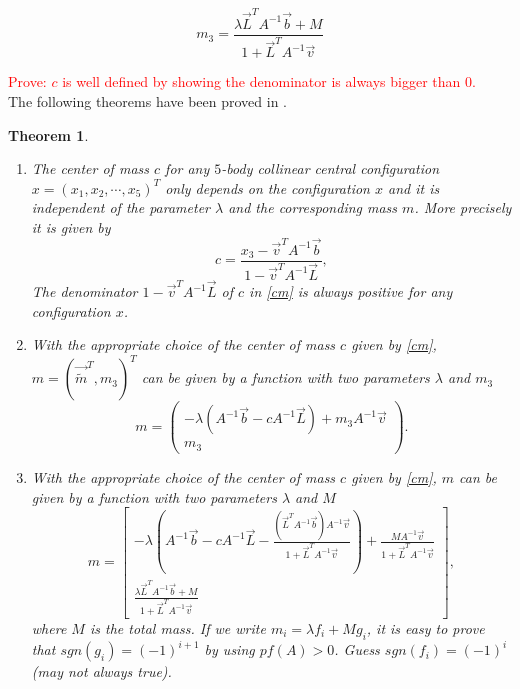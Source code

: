\documentclass[11pt,leqno]{article}
\newtheorem{theorem}{Theorem}[section]
\theoremstyle{definition}
\theoremstyle{remark}
\numberwithin{equation}{section}
\begin{document}
$$m_3=\frac{\lambda \vec{L}^TA^{-1}\vec{b}+M}{1+\vec{L}^TA^{-1}\vec{v}}$$


\textcolor{red}{Prove: $c$ is well defined by showing the denominator is always bigger than 0.}\\
The following theorems have been proved in \cite{ZX6}. 
\begin{theorem}\label{thm5}
\begin{enumerate}
 \item The center of mass $c$ for any $5$-body collinear central configuration $x=(x_1,x_2,\cdots,x_5)^T$ only depends on the configuration $x$ and it is independent of the parameter $\lambda$ and the corresponding mass $m$. More precisely it is given by
\begin{equation}\label{cm}
c=\frac{x_3-\vec{v}^TA^{-1}\vec{b}}{1-\vec{v}^TA^{-1}\vec{L}},
\end{equation}
The denominator $1-\vec{v}^TA^{-1}\vec{L}$ of $c$ in \eqref{cm} is always positive for any configuration $x$.
\item With the appropriate choice of the center of mass $c$ given by \eqref{cm}, $m=(\vec{\tilde{m}}^T,m_3)^T$ can be given by a function with two parameters $\lambda$ and $m_3$
\begin{equation}\label{mm5}
m=\left( \begin{array}{c}-\lambda(A^{-1}\vec{b}-cA^{-1}\vec{L})+m_3A^{-1}\vec{v} \\ m_3\end{array}\right).
\end{equation}
\item With the appropriate choice of the center of mass $c$ given by \eqref{cm}, $m$ can be given by a function with two parameters $\lambda$ and $M$
\begin{equation}\label{mm5M}
m=\left[ \begin{array}{c} -\lambda\left(A^{-1}\vec{b}-cA^{-1}\vec{L} - \frac{( \vec{L}^TA^{-1}\vec{b}) A^{-1}\vec{v}}{1+\vec{L}^TA^{-1}\vec{v}}\right )+ \frac{M A^{-1}\vec{v}}{1+\vec{L}^TA^{-1}\vec{v}}  \\ \frac{\lambda \vec{L}^TA^{-1}\vec{b}+M}{1+\vec{L}^TA^{-1}\vec{v}}\end{array}\right],
\end{equation}
where $M$ is the total mass.
If we write $m_i=\lambda f_i+Mg_i$, it is easy to prove that $sgn(g_i)=(-1)^{i+1}$ by using  $pf(A)>0$. Guess $sgn(f_i)=(-1)^{i}$ (may not always true). 
\end{enumerate}

\end{theorem}
\end{document}
